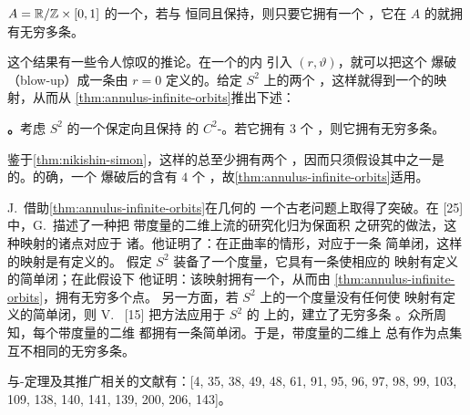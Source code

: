 \begin{theorem}\label{thm:annulus-infinite-orbits}
\trClosed\trAnnulus{} $A=\mathbb{R}/\mathbb{Z}\times[0,1]$ 的一个\trDiffeomorphism，若与%
恒同\trIsotopic{}且保持\trRegular\trMeasure，则只要它拥有一个%
\trFixedPoint，它在 $A$ 的\trInterior{}就拥有无穷多条\trPeriodicOrbit。
\end{theorem}

这个结果有一些令人惊叹的推论。在一个\trFixedPoint{}的\trNeighborhood{}内%
引入\trPolarCoordinates{} $(r,\vartheta)$，就可以把这个\trFixedPoint{}%
爆破（blow-up）成一条由 $r=0$ 定义的\trInvariant\trCircle。给定 $S^{2}$ 上的两个%
\trFixedPoint，这样就得到一个\trClosed\trAnnulus{}的映射，从而从%
\cref{thm:annulus-infinite-orbits}推出下述：

\textbf{\trhCorollary。}\quad 考虑 $S^{2}$ 的一个保定向且保持%
\trRegular\trMeasure{}的 $C^{2}$-\trDiffeomorphism。若它拥有 $3$ 个%
\trFixedPoint，则它拥有无穷多条\trPeriodicOrbit。

鉴于\cref{thm:nikishin-simon}，这样的\trDiffeomorphism{}总至少拥有两个%
\trFixedPoint，因而只须假设其中之一是\trHyperbolic{}的。的确，一个%
\trHyperbolic\trFixedPoint{}爆破后的\trInvariant\trCircle{}含有 $4$ 个%
\trFixedPoint，故\cref{thm:annulus-infinite-orbits}适用。

J.~\trFranks{}借助\cref{thm:annulus-infinite-orbits}在\trRiemann{}几何的%
一个古老问题上取得了突破。在 [25] 中，G.~\trBirkhoff{}描述了一种把%
带\trRiemann{}度量的二维\trSphere{}上\trGeodesic{}流的研究化归为保面积%
\trAnnulus\trMapping{}之研究的做法，这种映射的诸\trPeriodic{}点对应于%
诸\trClosed\trGeodesic。他证明了：在正\trGauss{}曲率的情形，对应于一条%
简单闭\trGeodesic，这样的\trBirkhoff{}\trAnnulus{}映射是有定义的。%
\trFranks{}假定 $S^{2}$ 装备了一个\trRiemann{}度量，它具有一条使相应的%
\trBirkhoff{}\trAnnulus{}映射有定义的简单闭\trGeodesic；在此假设下%
他证明：该映射拥有一个\trFixedPoint，从而由%
\cref{thm:annulus-infinite-orbits}，拥有无穷多个\trPeriodic{}点。%
另一方面，若 $S^{2}$ 上的一个\trRiemann{}度量没有任何使%
\trBirkhoff{}\trAnnulus{}映射有定义的简单闭\trGeodesic，则%
V.~\trBangert{} [15] 把\trVariational{}方法应用于 $S^{2}$ 的%
\trLoopSpace{}上的\trEnergy\trFunctional，建立了无穷多条%
\trClosed\trGeodesic。众所周知，每个带\trRiemann{}度量的二维\trSphere{}%
都拥有一条简单闭\trGeodesic。于是，带\trRiemann{}度量的二维\trSphere{}上%
总有作为点集互不相同的无穷多条\trClosed\trGeodesic。

与\trPoincare-\trBirkhoff{}定理及其推广相关的文献有：[4, 35, 38, 49, 48, %
61, 91, 95, 96, 97, 98, 99, 103, 109, 138, 140, 141, 139, 200, 206, 143]。
